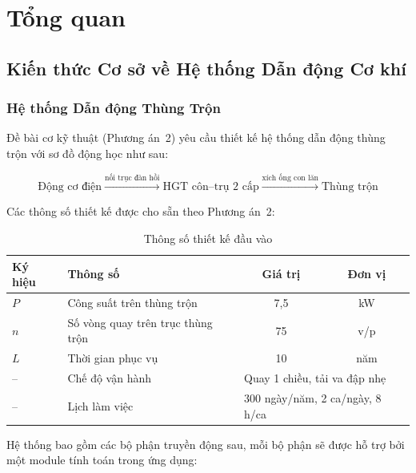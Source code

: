 \chapter{Tổng quan}
\label{chap:overview}

\section{Kiến thức Cơ sở về Hệ thống Dẫn động Cơ khí}
\label{sec:overview-mech}

\subsection{Hệ thống Dẫn động Thùng Trộn}

Đề bài cơ kỹ thuật (Phương án~2) yêu cầu thiết kế hệ thống dẫn động thùng trộn
với sơ đồ động học như sau:

\[
  \text{Động cơ điện} \xrightarrow{\text{nối trục đàn hồi}}
  \text{HGT côn--trụ 2 cấp} \xrightarrow{\text{xích ống con lăn}}
  \text{Thùng trộn}
\]

Các thông số thiết kế được cho sẵn theo Phương án~2:

\begin{table}[H]
  \centering
  \caption{Thông số thiết kế đầu vào}
  \label{tab:input-params}
  \begin{tabular}{llcc}
    \toprule
    \textbf{Ký hiệu} & \textbf{Thông số}                    & \textbf{Giá trị} & \textbf{Đơn vị} \\
    \midrule
    $P$              & Công suất trên thùng trộn            & 7,5              & kW              \\
    $n$              & Số vòng quay trên trục thùng trộn    & 75               & v/p             \\
    $L$              & Thời gian phục vụ                    & 10               & năm             \\
    --               & Chế độ vận hành                      & \multicolumn{2}{l}{Quay 1 chiều, tải va đập nhẹ} \\
    --               & Lịch làm việc                        & \multicolumn{2}{l}{300 ngày/năm, 2 ca/ngày, 8 h/ca} \\
    \bottomrule
  \end{tabular}
\end{table}

Hệ thống bao gồm các bộ phận truyền động sau, mỗi bộ phận sẽ được hỗ trợ bởi một module tính toán trong ứng dụng:


